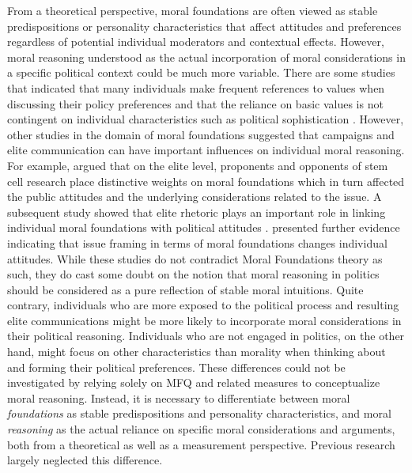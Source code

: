 \documentclass[12pt]{article}
\begin{document}
From a theoretical perspective, moral foundations are often viewed as stable predispositions or personality characteristics that affect attitudes and preferences regardless of potential individual moderators and contextual effects. However, moral reasoning understood as the actual incorporation of moral considerations in a specific political context could be much more variable. There are some studies that indicated that many individuals make frequent references to values when discussing their policy preferences \citep{feldman1992political} and that the reliance on basic values is not contingent on individual characteristics such as political sophistication \citep[e.g.][]{goren2001core,goren2004political,marietta2007values}. However, other studies in the domain of moral foundations suggested that campaigns and elite communication can have important influences on individual moral reasoning. For example, \citet{clifford2013words} argued that on the elite level, proponents and opponents of stem cell research place distinctive weights on moral foundations which in turn affected the public attitudes and the underlying considerations related to the issue. A subsequent study showed that elite rhetoric plays an important role in linking individual moral foundations with political attitudes \citep{clifford2015concerns}. \citet{day2014shifting} presented further evidence indicating that issue framing in terms of moral foundations changes individual attitudes. While these studies do not contradict Moral Foundations theory as such, they do cast some doubt on the notion that moral reasoning in politics should be considered as a pure reflection of stable moral intuitions. Quite contrary, individuals who are more exposed to the political process and resulting elite communications might be more likely to incorporate moral considerations in their political reasoning. Individuals who are not engaged in politics, on the other hand, might focus on other characteristics than morality when thinking about and forming their political preferences. These differences could not be investigated by relying solely on MFQ and related measures to conceptualize moral reasoning. Instead, it is necessary to differentiate between moral \textit{foundations} as stable predispositions and personality characteristics, and moral \textit{reasoning} as the actual reliance on specific moral considerations and arguments, both from a theoretical as well as a measurement perspective. Previous research largely neglected this difference.
\end{document}

